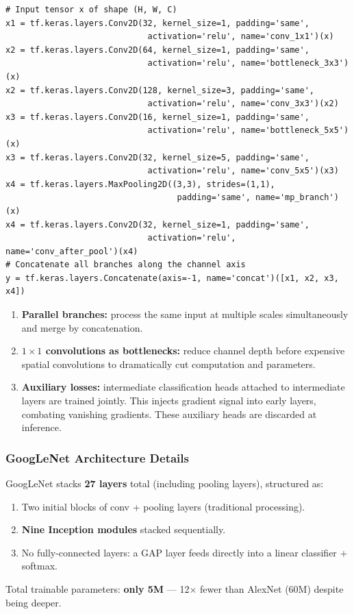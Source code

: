 \documentclass[11pt,a4paper]{article}
\begin{document}
\begin{lstlisting}[caption={Simplified Inception module in Keras}]
# Input tensor x of shape (H, W, C)
x1 = tf.keras.layers.Conv2D(32, kernel_size=1, padding='same',
                             activation='relu', name='conv_1x1')(x)
x2 = tf.keras.layers.Conv2D(64, kernel_size=1, padding='same',
                             activation='relu', name='bottleneck_3x3')(x)
x2 = tf.keras.layers.Conv2D(128, kernel_size=3, padding='same',
                             activation='relu', name='conv_3x3')(x2)
x3 = tf.keras.layers.Conv2D(16, kernel_size=1, padding='same',
                             activation='relu', name='bottleneck_5x5')(x)
x3 = tf.keras.layers.Conv2D(32, kernel_size=5, padding='same',
                             activation='relu', name='conv_5x5')(x3)
x4 = tf.keras.layers.MaxPooling2D((3,3), strides=(1,1),
                                   padding='same', name='mp_branch')(x)
x4 = tf.keras.layers.Conv2D(32, kernel_size=1, padding='same',
                             activation='relu', name='conv_after_pool')(x4)
# Concatenate all branches along the channel axis
y = tf.keras.layers.Concatenate(axis=-1, name='concat')([x1, x2, x3, x4])
\end{lstlisting}

\begin{insightbox}
\begin{enumerate}
  \item \textbf{Parallel branches:} process the same input at multiple scales simultaneously and merge by concatenation.
  \item \textbf{$1\times1$ convolutions as bottlenecks:} reduce channel depth before expensive spatial convolutions to dramatically cut computation and parameters.
  \item \textbf{Auxiliary losses:} intermediate classification heads attached to intermediate layers are trained jointly. This injects gradient signal into early layers, combating vanishing gradients. These auxiliary heads are discarded at inference.
\end{enumerate}
\end{insightbox}

\subsubsection{GoogLeNet Architecture Details}

GoogLeNet stacks \textbf{27 layers} total (including pooling layers), structured as:
\begin{enumerate}
  \item Two initial blocks of conv + pooling layers (traditional processing).
  \item \textbf{Nine Inception modules} stacked sequentially.
  \item No fully-connected layers: a GAP layer feeds directly into a linear classifier + softmax.
\end{enumerate}
Total trainable parameters: \textbf{only 5M} — 12$\times$ fewer than AlexNet (60M) despite being deeper.
\end{document}
